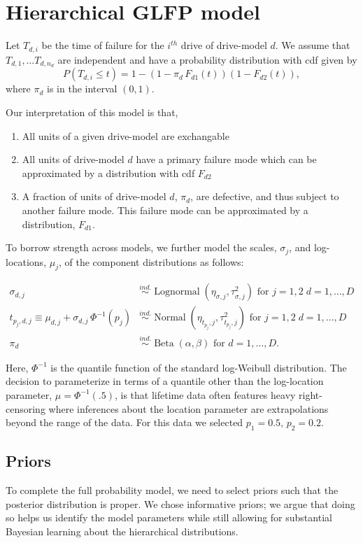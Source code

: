 \documentclass{article}
\newcommand{\ind}{\stackrel{ind.}{\sim}}
\newcommand{\op}{\operatorname}
\begin{document}
\section{Hierarchical GLFP model}
Let $T_{d,i}$ be the time of failure for the $i^{th}$ drive of drive-model $d$.
We assume that $T_{d,1},\ldots T_{d,n_d}$ are independent and have a probability distribution with cdf given by
\begin{equation*}
P(T_{d,i}\le t) = 1 - (1-\pi_d\, F_{d1}(t))(1 - F_{d2}(t)),
\end{equation*}
where $\pi_d$ is in the interval $(0,1)$.

Our interpretation of this model is that,
\begin{enumerate}
\item All units of a given drive-model are exchangable
\item All units of drive-model $d$ have a primary failure mode
  which can be approximated by a distribution with cdf $F_{d2}$
\item A fraction of units of drive-model $d$, $\pi_d$, are defective,
  and thus subject to another failure mode. This failure mode can be
  approximated by a distribution, $F_{d1}$.
\end{enumerate}

To borrow strength across models, we further model the scales, $\sigma_j$, and log-locations, $\mu_j$, of the component distributions as follows:

\begin{align*}
\sigma_{d,j} &\ind \op{Lognormal} \left( \eta_{\sigma,j}, \tau^2_{\sigma,j} \right) \mbox{ for } j=1,2\; d=1,\ldots,D\\
t_{p_j,d,j} \equiv \mu_{d,j} + \sigma_{d,j}\,\Phi^{-1}(p_j) & \ind \op{Normal} \left(\eta_{t_{p_j},j}, \tau^2_{t_{p_j},j}\right) \mbox{ for } j=1,2\; d=1,\ldots,D\\
\pi_d &\ind \op{Beta}(\alpha, \beta) \mbox{ for } d=1,\ldots,D.
\end{align*}

Here, $\Phi^{-1}$ is the quantile function of the standard log-Weibull distribution. The decision to parameterize in terms of a quantile other than the log-location parameter, $\mu = \Phi^{-1}(.5)$, is that lifetime data often features heavy right-censoring where inferences about the location parameter are extrapolations beyond the range of the data. For this data we selected $p_1=0.5,\, p_2 = 0.2$.

\subsection{Priors}
To complete the full probability model, we need to select priors such that the posterior distribution is proper. We chose informative priors; we argue that doing so helps us identify the model parameters while still allowing for substantial Bayesian learning about the hierarchical distributions.
\end{document}
